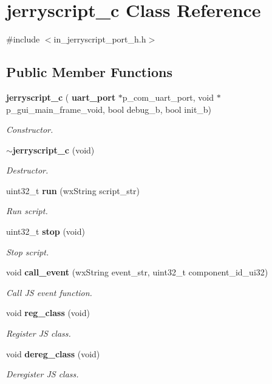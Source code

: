 \section{jerryscript\+\_\+c Class Reference}
\label{classjerryscript__c}


{\ttfamily \#include $<$in\+\_\+jerryscript\+\_\+port\+\_\+h.\+h$>$}

\subsection*{Public Member Functions}
\begin{DoxyCompactItemize}
\item 
\textbf{ jerryscript\+\_\+c} (\textbf{ uart\+\_\+port} $\ast$p\+\_\+com\+\_\+uart\+\_\+port, void $\ast$p\+\_\+gui\+\_\+main\+\_\+frame\+\_\+void, bool debug\+\_\+b, bool init\+\_\+b)
\begin{DoxyCompactList}\small\item\em Constructor. \end{DoxyCompactList}\item 
\textbf{ $\sim$jerryscript\+\_\+c} (void)
\begin{DoxyCompactList}\small\item\em Destructor. \end{DoxyCompactList}\item 
uint32\+\_\+t \textbf{ run} (wx\+String script\+\_\+str)
\begin{DoxyCompactList}\small\item\em Run script. \end{DoxyCompactList}\item 
uint32\+\_\+t \textbf{ stop} (void)
\begin{DoxyCompactList}\small\item\em Stop script. \end{DoxyCompactList}\item 
void \textbf{ call\+\_\+event} (wx\+String event\+\_\+str, uint32\+\_\+t component\+\_\+id\+\_\+ui32)
\begin{DoxyCompactList}\small\item\em Call JS event function. \end{DoxyCompactList}\item 
void \textbf{ reg\+\_\+class} (void)
\begin{DoxyCompactList}\small\item\em Register JS class. \end{DoxyCompactList}\item 
void \textbf{ dereg\+\_\+class} (void)
\begin{DoxyCompactList}\small\item\em Deregister JS class. \end{DoxyCompactList}\end{DoxyCompactItemize}
